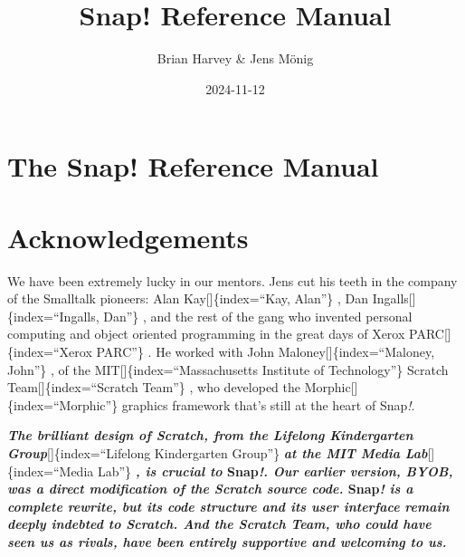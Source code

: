 \documentclass[
  letterpaper,
]{book}
\title{Snap! Reference Manual}
\author{Brian Harvey \& Jens Mönig}
\date{2024-11-12}
\renewcommand*\contentsname{Table of contents}
\newcommand\contentsname{Table of contents}
\begin{document}
\frontmatter
\maketitle

\renewcommand*\contentsname{Table of contents}
{
\setcounter{tocdepth}{2}
\tableofcontents
}

\mainmatter
{}

\chapter*{The Snap! Reference Manual}\label{the-snap-reference-manual}




\chapter{Acknowledgements}\label{acknowledgements}

We have been extremely lucky in our mentors. Jens cut his teeth in the
company of the Smalltalk pioneers: Alan Kay{[}{]}\{index=``Kay, Alan''\}
, Dan Ingalls{[}{]}\{index=``Ingalls, Dan''\} , and the rest of the gang
who invented personal computing and object oriented programming in the
great days of Xerox PARC{[}{]}\{index=``Xerox PARC''\} . He worked with
John Maloney{[}{]}\{index=``Maloney, John''\} , of the
MIT{[}{]}\{index=``Massachusetts Institute of Technology''\} Scratch
Team{[}{]}\{index=``Scratch Team''\} , who developed the
Morphic{[}{]}\{index=``Morphic''\} graphics framework that's still at
the heart of Snap\emph{!}.

\textbf{\emph{The brilliant design of Scratch, from the Lifelong
Kindergarten Group}}{[}{]}\{index=``Lifelong Kindergarten Group''\}
\textbf{\emph{at the MIT Media Lab}}{[}{]}\{index=``Media Lab''\}
\textbf{\emph{, is crucial to} Snap\emph{!. Our earlier version, BYOB,
was a direct modification of the Scratch source code.} Snap\emph{! is a
complete rewrite, but its code structure and its user interface remain
deeply indebted to Scratch. And the Scratch Team, who could have seen us
as rivals, have been entirely supportive and welcoming to us.}}
\end{document}
